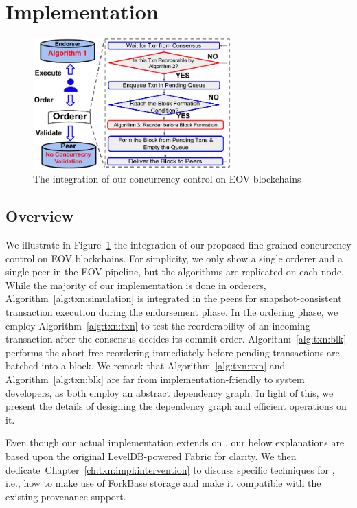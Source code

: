 \section{Implementation}
\label{ch:txn:impl}

\begin{figure}
  \center
	\includegraphics[width=0.68\textwidth]{diagram/txn/fabricX_arch.pdf}
  \caption{The integration of our concurrency control on EOV blockchains}
	\label{diagram:txn:impl:fabricx}
\end{figure}

\subsection{Overview}
We illustrate in Figure~\ref{diagram:txn:impl:fabricx} the integration of our proposed fine-grained concurrency control on EOV blockchains. 
%
For simplicity, we only show a single orderer and a single peer in the EOV pipeline, but the algorithms are replicated on each node. 
%
While the majority of our implementation is done in orderers, Algorithm~\ref{alg:txn:simulation} is integrated in the peers for snapshot-consistent transaction execution during the endorsement phase.
%
In the ordering phase, we employ Algorithm~\ref{alg:txn:txn} to test the reorderability of an incoming transaction after the consensus decides its commit order.
%
Algorithm~\ref{alg:txn:blk} performs the abort-free reordering immediately before pending transactions are batched into a block. 
%
We remark that Algorithm~\ref{alg:txn:txn} and Algorithm~\ref{alg:txn:blk} are far from implementation-friendly to system developers, as both employ an abstract dependency graph.
%
In light of this, we present the details of designing the dependency graph and efficient operations on it.

Even though our actual implementation extends on {\fs}, our below explanations are based upon the original LevelDB-powered Fabric for clarity. 
%
We then dedicate~Chapter~\ref{ch:txn:impl:intervention} to discuss specific techniques for {\fs} , i.e., how to make use of ForkBase storage and make it compatible with the existing provenance support. 

